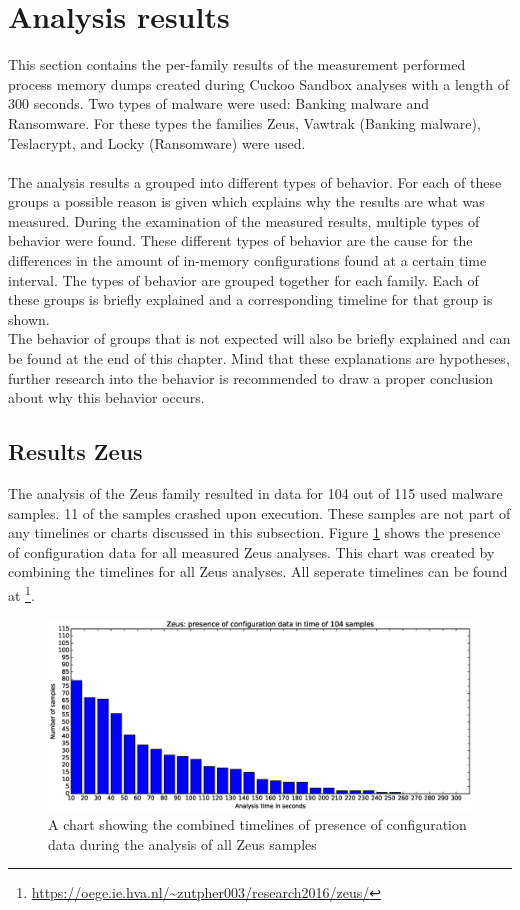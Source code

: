 \documentclass[conference]{IEEEtran}
\begin{document}
\section{Analysis results}
This section contains the per-family results of the measurement performed process memory dumps created during Cuckoo Sandbox analyses with a length of 300 seconds. Two types of malware were used: Banking malware and Ransomware.  For these types the families Zeus, Vawtrak (Banking malware), Teslacrypt, and Locky (Ransomware) were used.\\\\ The analysis results a grouped into different types of behavior. For each of these groups a possible reason is given which explains why the results are what was measured. During the examination of the measured results, multiple types of behavior were found. These different types of behavior are the cause for the differences in the amount of in-memory configurations found at a certain time interval. The types of behavior are grouped together for each family. Each of these groups is briefly explained and a corresponding timeline for that group is shown. \\The behavior of groups that is not expected will also be briefly explained and can be found at the end of this chapter. Mind that these explanations are hypotheses, further research into the behavior is recommended to draw a proper conclusion about why this behavior occurs.


\subsection{Results Zeus}
The analysis of the Zeus family resulted in data for 104 out of 115 used malware samples. 11 of the samples crashed upon execution. These samples are not part of any timelines or charts discussed in this subsection. Figure \ref{fig:zeus-bar} shows the presence of \Gls{configuration data} for all measured Zeus analyses. This chart was created by combining the timelines for all Zeus analyses. All seperate timelines can be found at \footnote{\url{https://oege.ie.hva.nl/~zutpher003/research2016/zeus/}}.\\

\begin{figure}[!h]
	\hspace{-3cm}
    \includegraphics[width=13cm,trim=-95mm 0mm 0mm 9mm, clip=true]{images/zeus/Zeus-barchart.eps}
    \caption{A chart showing the combined timelines of presence of configuration data during the analysis of all Zeus samples}
    \label{fig:zeus-bar}
\end{figure}
\end{document}
